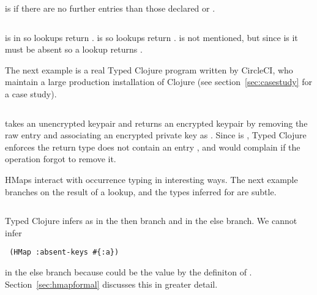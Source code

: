  is  if there are no further entries
than those declared  or .
\begin{Code}
\begin{exmp}
\inputminted[firstline=17,lastline=26]{clojure}{code/demo/src/demo/hmap_path.clj}
\end{exmp}
\end{Code}
 is  in  so lookups return .
 is  so lookups return .
 is not mentioned, but since  is 
it must be absent so a lookup returns .

The next example is a real Typed Clojure program written by CircleCI, who maintain a large production
installation of Clojure (see section~\ref{sec:casestudy} for a case study).

\begin{Code}
\begin{exmp}
\inputminted[firstline=10,lastline=22]{clojure}{code/demo/src/demo/key.clj}
\end{exmp}
\end{Code}

 takes an unencrypted keypair and returns an encrypted keypair by
removing the raw  entry and associating an encrypted private key
as .
Since  is , Typed Clojure enforces the return type
does not contain an entry , and would complain if the 
operation forgot to remove it.

HMaps interact with occurrence typing in interesting ways.
The next example branches on the result of a lookup, and the types
inferred for  are subtle.

\begin{Code}
\begin{exmp}
\inputminted[firstline=14,lastline=15]{clojure}{code/demo/src/demo/hmap_path.clj}
\end{exmp}
\end{Code}

Typed Clojure infers  as  in the then branch
and 
in the else branch.
We cannot infer 
\begin{verbatim}
 (HMap :absent-keys #{:a})
\end{verbatim}
in the else branch because  could be the value 
by the definiton of .
Section~\ref{sec:hmapformal} discusses this in greater detail.

